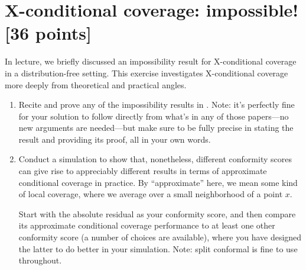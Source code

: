 \documentclass{article}
\begin{document}
\section{X-conditional coverage: impossible! [36 points]}

In lecture, we briefly discussed an impossibility result for X-conditional
coverage in a distribution-free setting. This exercise investigates
X-conditional coverage more deeply from theoretical and practical angles. 

\begin{enumerate}[label=(\alph*)]
\item Recite and prove any of the impossibility results in
  \citet{lei2014distribution, vovk2012conditional, barber2021limits}. Note: it's
  perfectly fine for your solution to follow directly from what's in any of
  those papers---no new arguments are needed---but make sure to be fully precise
  in stating the result and providing its proof, all in your own words.  
  \marginpar{\small [16 pts]}

\item Conduct a simulation to show that, nonetheless, different conformity
  scores can give rise to appreciably different results in terms of approximate
  conditional coverage in practice. By ``approximate'' here, we mean some
  kind of local coverage, where we average over a small neighborhood of a point 
  $x$.    

  Start with the absolute residual as your conformity score, and then compare
  its approximate conditional coverage performance to at least one other
  conformity score (a number of choices are available), where you have designed
  the latter to do better in your simulation. Note: split conformal is fine to
  use throughout.  
  \marginpar{\small [20 pts]}
\end{enumerate}





\end{document}
